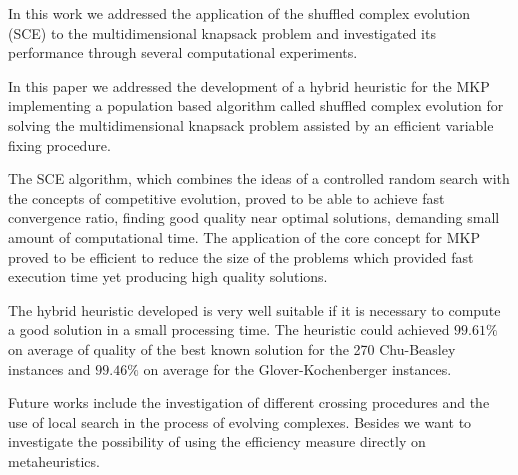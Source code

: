 
In this work we addressed the application of the shuffled complex
evolution (SCE) to the multidimensional knapsack problem and investigated its
performance through several computational experiments.

In this paper we addressed the development of a hybrid heuristic for the MKP
implementing a population based algorithm called shuffled complex evolution
for solving the multidimensional knapsack problem assisted by an efficient
variable fixing procedure.

The SCE algorithm, which combines the ideas of a controlled random search with
the concepts of competitive evolution, proved to be able to achieve fast
convergence ratio, finding good quality near optimal solutions, demanding small
amount of computational time.
The application of the core concept for MKP proved to be efficient to reduce
the size of the problems which provided fast execution time yet producing
high quality solutions.

The hybrid heuristic developed is very well suitable if it is necessary
to compute a good solution in a small processing time.
The heuristic could achieved $99.61\%$ on average of quality of the best known solution for
the 270 Chu-Beasley instances and $99.46\%$ on average for the Glover-Kochenberger instances.

Future works include the investigation of different crossing procedures 
and the use of local search in the process of evolving complexes.
Besides we want to investigate the possibility of using the efficiency measure
directly on metaheuristics.

